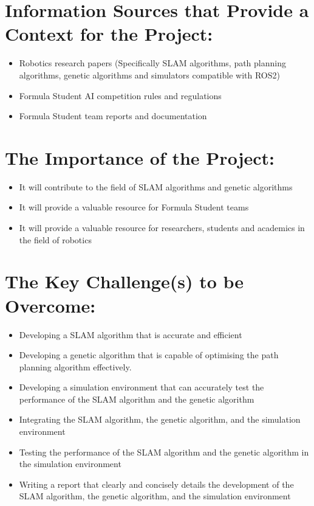 \documentclass[11pt]{article}
\begin{document}
    \section*{Information Sources that Provide a Context for the Project:}
    \begin{itemize}
        \item Robotics research papers (Specifically SLAM algorithms, path planning algorithms, genetic algorithms and simulators compatible with ROS2)\cite{LeLargeBiederLauer2021, HarperEvolutionary, platt2022comparative}
        \item Formula Student AI competition rules and regulations\cite{FSUKAIRules2025}
        \item Formula Student team reports and documentation
    \end{itemize}

    \section*{The Importance of the Project:}
    \begin{itemize}
        \item It will contribute to the field of SLAM algorithms and genetic algorithms
        \item It will provide a valuable resource for Formula Student teams
        \item It will provide a valuable resource for researchers, students and academics in the field of robotics
    \end{itemize}

    \section*{The Key Challenge(s) to be Overcome:}
    \begin{itemize}
        \item Developing a SLAM algorithm that is accurate and efficient
        \item Developing a genetic algorithm that is capable of optimising the path planning algorithm effectively.
        \item Developing a simulation environment that can accurately test the performance of the SLAM algorithm and the genetic algorithm
        \item Integrating the SLAM algorithm, the genetic algorithm, and the simulation environment
        \item Testing the performance of the SLAM algorithm and the genetic algorithm in the simulation environment
        \item Writing a report that clearly and concisely details the development of the SLAM algorithm, the genetic algorithm, and the simulation environment
    \end{itemize}

    \printbibliography
\end{document}
